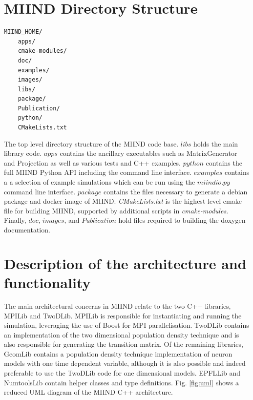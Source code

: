 \documentclass[utf8]{frontiers_suppmat} %
\begin{document}
\onecolumn
{}

\title[Supplementary Material]{{}}


\maketitle

\section {MIIND Directory Structure}
\label{directorystructure}

\begin{lstlisting}
MIIND_HOME/
    apps/
    cmake-modules/
    doc/
    examples/
    images/
    libs/
    package/
    Publication/
    python/
    CMakeLists.txt
\end{lstlisting}

The top level directory structure of the MIIND code base. $libs$ holds the main library code. $apps$ contains the ancillary executables such as MatrixGenerator and Projection as well as various tests and C++ examples. $python$ contains the full MIIND Python API including the command line interface. $examples$ contains a a selection of example simulations which can be run using the $miindio.py$ command line interface. $package$ contains the files necessary to generate a debian package and docker image of MIIND. \textit{CMakeLists.txt} is the highest level cmake file for building MIIND, supported by additional scripts in \textit{cmake-modules}. Finally, $doc$, $images$, and $Publication$ hold files required to building the doxygen documentation.

\section{Description of the architecture and functionality}
The main architectural concerns in MIIND relate to the two C++ libraries, MPILib and TwoDLib. MPILib is responsible for instantiating and running the simulation, leveraging the use of Boost for MPI parallelisation. TwoDLib contains an implementation of the two dimensional population density technique and is also responsible for generating the transition matrix. Of the remaining libraries, GeomLib contains a population density technique implementation of neuron models with one time dependent variable, although it is also possible and indeed preferable to use the TwoDLib code for one dimensional models. EPFLLib and NumtoolsLib contain helper classes and type definitions. Fig. \ref{fig:uml} shows a reduced UML diagram of the MIIND C++ architecture.\\
\end{document}
